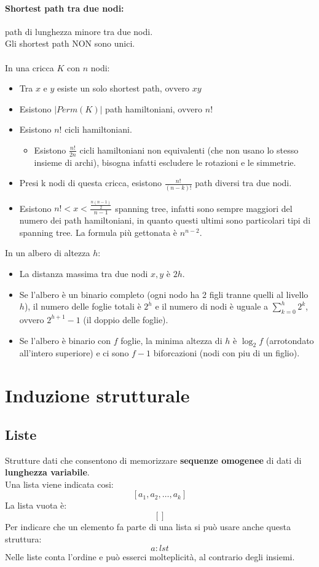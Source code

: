 \documentclass[a4paper,12pt]{article}
\let\oldsection\section
\renewcommand{\section}{\clearpage\oldsection}
\begin{document}
\paragraph{Shortest path tra due nodi: } path di lunghezza minore tra due nodi.\\
Gli shortest path NON sono unici.\\\\
In una cricca $K$ con $n$ nodi:
\begin{itemize}
    \item Tra $x$ e $y$ esiste un solo shortest path, ovvero $xy$
    \item Esistono $|Perm(K)|$ path hamiltoniani, ovvero $n!$
    \item Esistono $n!$ cicli hamiltoniani.
    \begin{itemize}
        \item Esistono $\frac{n!}{2n}$ cicli hamiltoniani non equivalenti (che non usano lo stesso insieme di archi), bisogna
    infatti escludere le rotazioni e le simmetrie.
    \end{itemize} 
    \item Presi k nodi di questa cricca, esistono $\frac{n!}{(n-k)!}$ path diversi tra due nodi.
    \item Esistono $n! < x < \frac{\frac{n(n-1)}{2}}{n-1}$ spanning tree, infatti sono sempre maggiori del numero dei path hamiltoniani, in quanto questi ultimi sono particolari tipi di spanning tree. La formula più gettonata è $n^{n-2}$.
\end{itemize}
In un albero di altezza $h$:
\begin{itemize}
    \item La distanza massima tra due nodi $x,y$ è $2h$.
    \item Se l'albero è un binario completo (ogni nodo ha 2 figli tranne quelli al livello $h$), il numero delle foglie totali è $2^h$ e il numero di nodi è uguale a $\sum_{k=0}^h 2^k$, ovvero $2^{h+1} - 1$ (il doppio delle foglie).
    \item Se l'albero è binario con $f$ foglie, la minima altezza di $h$ è $\log_2f$ (arrotondato all'intero superiore) e ci sono $f-1$ biforcazioni (nodi con piu di un figlio).
\end{itemize}

\section{Induzione strutturale}
\subsection{Liste}
Strutture dati che consentono di memorizzare \textbf{sequenze omogenee} di dati di \textbf{lunghezza variabile}.\\
Una lista viene indicata cosi:
\[
[a_1,a_2, \ldots ,a_k]
\]
La lista vuota è:
\[
[]
\]
Per indicare che un elemento fa parte di una lista si può usare anche questa struttura:
\[
a : lst
\]
Nelle liste conta l'ordine e può esserci molteplicità, al contrario degli insiemi.
\end{document}
